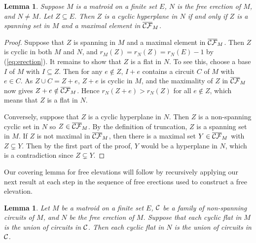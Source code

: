 \documentclass{daj}
\newtheorem{lemma}[thm]{Lemma}\theoremstyle{plain}
\begin{document}
\begin{lemma}
\label{lem:hyperplane}
Suppose $M$ is a matroid on a finite set $E$, $N$ is the free erection of $M$, and  $N\neq M$. Let $Z\subseteq E$.
Then
$Z$ is a cyclic hyperplane in $N$ if and only if $Z$ is a spanning set in $M$ and a maximal element in $\overline{\cal CF}_M$.
\end{lemma}
\begin{proof}
Suppose that $Z$ is spanning in $M$
and  a maximal element in $\overline{\cal CF}_M$.
Then $Z$ is cyclic in both $M$ and $N$, and
$r_M(Z)=r_N(Z)=r_N(E)-1$ by (\ref{eq:erection}).
It remains  to show that $Z$ is a flat in $N$.
To see this, choose a base $I$ of $M$ with  $I\subseteq Z$.
Then for any $e\notin Z$, $I+e$ contains a circuit $C$ of $M$ with $e\in C$.
As $Z\cup C=Z+e$, $Z+e$ is cyclic in $M$, and the maximality of $Z$ in $\overline{\cal CF}_M$ now gives $Z+e \notin \overline{\cal CF}_M$.
Hence $r_N(Z+e)>r_N(Z)$ for all $e\notin Z$, which means that $Z$ is a flat in $N$.

Conversely, suppose that $Z$ is a cyclic hyperplane in $N$.
Then $Z$ is a non-spanning cyclic set in $N$ so $Z\in \overline{\cal CF}_M$. 
By the definition of truncation,
$Z$ is a spanning set in $M$. 
If $Z$ is not maximal in $\overline{\cal CF}_M$, then there is a maximal set $Y\in \overline{\cal CF}_M$ with $Z\subsetneq Y$.
Then by the first part of the proof, $Y$ would be a hyperplane in $N$, which is a contradiction since $Z\subsetneq Y$.
\end{proof}

Our covering lemma for free elevations will follow by recursively applying our next result at each step in the sequence of free erections used to construct a free elevation.
 
\begin{lemma}\label{lem:coveringnew}
Let $M$ be a matroid on a finite set $E$, ${\cal C}$ be a family of  non-spanning circuits of $M$, and $N$ be the free erection of  $M$.
Suppose that each cyclic flat in $M$ is the union of circuits in ${\cal C}$.
Then each cyclic flat in $N$ is the union of circuits in ${\cal C}$.
\end{lemma}
\end{document}
